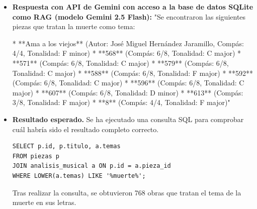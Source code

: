 \begin{itemize}
Si quieres, puedo ayudarte a encontrar algunas piezas musicales conocidas que se refieren al tema de la muerte. Por ejemplo:

* ""Requiem"" de Wolfgang Amadeus Mozart
* ""La muerte y la dama"" (opera) de Benjamin Britten
* ""Misa de Réquiem"" de Gabriel Fauré

¿Te gustaría que te sugiera más opciones?"
\item \textbf{Respuesta con API de Gemini con acceso a la base de datos SQLite como RAG (modelo Gemini 2.5 Flash):} "Se encontraron las siguientes piezas que tratan la muerte como tema:

*   **Ama a los viejos** (Autor: José Miguel Hernández Jaramillo, Compás: 4/4, Tonalidad: F minor)
*   **568** (Compás: 6/8, Tonalidad: C major)
*   **571** (Compás: 6/8, Tonalidad: C major)
*   **579** (Compás: 6/8, Tonalidad: C major)
*   **588** (Compás: 6/8, Tonalidad: F major)
*   **592** (Compás: 6/8, Tonalidad: C major)
*   **596** (Compás: 6/8, Tonalidad: C major)
*   **607** (Compás: 6/8, Tonalidad: D minor)
*   **613** (Compás: 3/8, Tonalidad: F major)
*   **8** (Compás: 4/4, Tonalidad: F major)"
\item \textbf{Resultado esperado.} Se ha ejecutado una consulta SQL para comprobar cuál habría sido el resultado completo correcto.
    \begin{verbatim}
SELECT p.id, p.titulo, a.temas
FROM piezas p
JOIN analisis_musical a ON p.id = a.pieza_id
WHERE LOWER(a.temas) LIKE '%muerte%';
    \end{verbatim}    
    Tras realizar la consulta, se obtuvieron 768 obras que tratan el tema de la muerte en sus letras.

\end{itemize}

